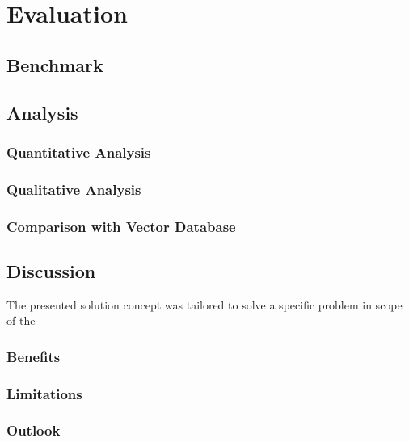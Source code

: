 \section{Evaluation\label{sec:evaluation}}

\subsection{Benchmark}

\subsection{Analysis}
    \subsubsection{Quantitative Analysis}
    
    \subsubsection{Qualitative Analysis}
    
    \subsubsection{Comparison with Vector Database}


\subsection{Discussion}
The presented solution concept was tailored to solve a specific problem in scope of the

    \subsubsection{Benefits}
    
    \subsubsection{Limitations}
    
    \subsubsection{Outlook}